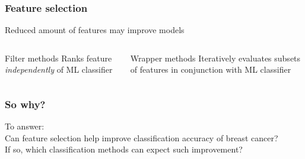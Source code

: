 \documentclass[aspectratio=1610]{beamer}
\begin{document}
\begin{frame}
  \frametitle{\hfill Feature selection}
  Reduced amount of features may improve models\pause
  \begin{columns}[T]
    \begin{column}{.5\textwidth}
      \begin{block}{Filter methods}
        Ranks feature \textit{independently} of ML classifier
      \end{block}
    \end{column}
    \begin{column}{.5\textwidth}
      \begin{block}{Wrapper methods}
        Iteratively evaluates subsets of features in conjunction with ML classifier
      \end{block}
    \end{column}
  \end{columns}
\end{frame}

\begin{frame}
  \frametitle{\hfill So why?}
  To answer:\\
  \vspace{0.05\textheight}
  Can feature selection help improve classification accuracy of breast cancer?\\
  \vspace{0.05\textheight}
  If so, which classification methods can expect such improvement?\\
\end{frame}

\end{document}
